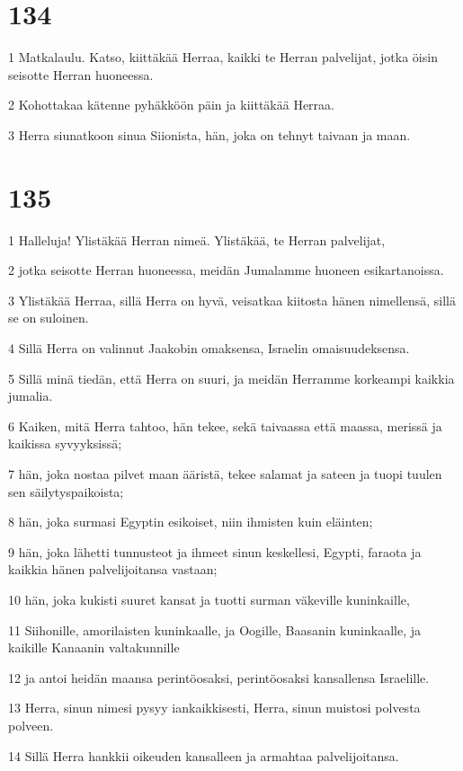 \chapter{134}

\par 1 Matkalaulu. Katso, kiittäkää Herraa, kaikki te Herran palvelijat, jotka öisin seisotte Herran huoneessa.
\par 2 Kohottakaa kätenne pyhäkköön päin ja kiittäkää Herraa.
\par 3 Herra siunatkoon sinua Siionista, hän, joka on tehnyt taivaan ja maan.

\chapter{135}

\par 1 Halleluja! Ylistäkää Herran nimeä. Ylistäkää, te Herran palvelijat,
\par 2 jotka seisotte Herran huoneessa, meidän Jumalamme huoneen esikartanoissa.
\par 3 Ylistäkää Herraa, sillä Herra on hyvä, veisatkaa kiitosta hänen nimellensä, sillä se on suloinen.
\par 4 Sillä Herra on valinnut Jaakobin omaksensa, Israelin omaisuudeksensa.
\par 5 Sillä minä tiedän, että Herra on suuri, ja meidän Herramme korkeampi kaikkia jumalia.
\par 6 Kaiken, mitä Herra tahtoo, hän tekee, sekä taivaassa että maassa, merissä ja kaikissa syvyyksissä;
\par 7 hän, joka nostaa pilvet maan ääristä, tekee salamat ja sateen ja tuopi tuulen sen säilytyspaikoista;
\par 8 hän, joka surmasi Egyptin esikoiset, niin ihmisten kuin eläinten;
\par 9 hän, joka lähetti tunnusteot ja ihmeet sinun keskellesi, Egypti, faraota ja kaikkia hänen palvelijoitansa vastaan;
\par 10 hän, joka kukisti suuret kansat ja tuotti surman väkeville kuninkaille,
\par 11 Siihonille, amorilaisten kuninkaalle, ja Oogille, Baasanin kuninkaalle, ja kaikille Kanaanin valtakunnille
\par 12 ja antoi heidän maansa perintöosaksi, perintöosaksi kansallensa Israelille.
\par 13 Herra, sinun nimesi pysyy iankaikkisesti, Herra, sinun muistosi polvesta polveen.
\par 14 Sillä Herra hankkii oikeuden kansalleen ja armahtaa palvelijoitansa.

